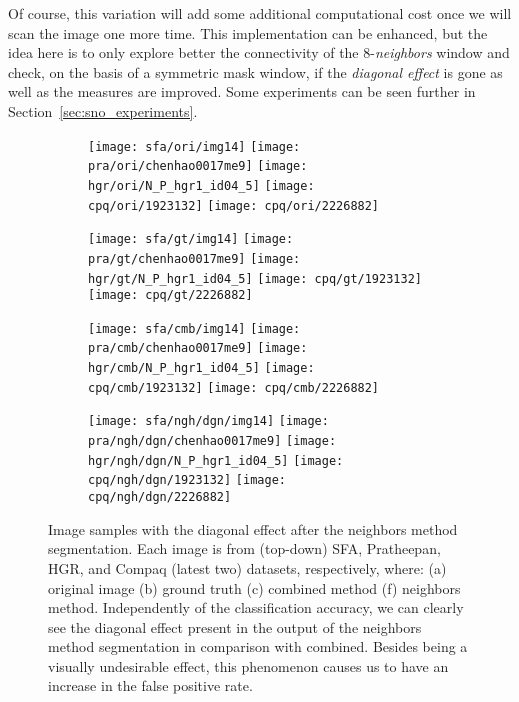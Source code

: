 Of course, this variation will add some additional computational cost once we will scan the image one more time. This implementation can be enhanced, but the idea here is to only explore better the connectivity of the 8-\textit{neighbors} window and check, on the basis of a symmetric mask window, if the \textit{diagonal effect} is gone as well as the measures are improved. Some experiments can be seen further in Section~\ref{sec:sno_experiments}.

\begin{figure*}[!htb]
    \centering
    \begin{subfigure}[t]{0.18\textwidth}
        \texttt{[image: sfa/ori/img14]}
        \texttt{[image: pra/ori/chenhao0017me9]}
        \texttt{[image: hgr/ori/N\_P\_hgr1\_id04\_5]}
        \texttt{[image: cpq/ori/1923132]}
        \texttt{[image: cpq/ori/2226882]}
        \caption{}
    \end{subfigure}
    \begin{subfigure}[t]{0.18\textwidth}
        \texttt{[image: sfa/gt/img14]}
        \texttt{[image: pra/gt/chenhao0017me9]}
        \texttt{[image: hgr/gt/N\_P\_hgr1\_id04\_5]}
        \texttt{[image: cpq/gt/1923132]}
        \texttt{[image: cpq/gt/2226882]}
        \caption{}
    \end{subfigure}
    \begin{subfigure}[t]{0.18\textwidth}
        \texttt{[image: sfa/cmb/img14]}
        \texttt{[image: pra/cmb/chenhao0017me9]}
        \texttt{[image: hgr/cmb/N\_P\_hgr1\_id04\_5]}
        \texttt{[image: cpq/cmb/1923132]}
        \texttt{[image: cpq/cmb/2226882]}
        \caption{}
    \end{subfigure}
    \begin{subfigure}[t]{0.18\textwidth}
        \texttt{[image: sfa/ngh/dgn/img14]}
        \texttt{[image: pra/ngh/dgn/chenhao0017me9]}
        \texttt{[image: hgr/ngh/dgn/N\_P\_hgr1\_id04\_5]}
        \texttt{[image: cpq/ngh/dgn/1923132]}
        \texttt{[image: cpq/ngh/dgn/2226882]}
        \caption{}
    \end{subfigure}

    \caption[Image samples with the diagonal effect after the neighbors method segmentation]{Image samples with the diagonal effect after the neighbors method segmentation. Each image is from (top-down) SFA, Pratheepan, HGR, and Compaq (latest two) datasets, respectively, where: (a) original image (b) ground truth (c) combined method (f) neighbors method. Independently of the classification accuracy, we can clearly see the diagonal effect present in the output of the neighbors method segmentation in comparison with combined. Besides being a visually undesirable effect, this phenomenon causes us to have an increase in the false positive rate.}
    \label{fig:diagonal_effect}
\end{figure*}